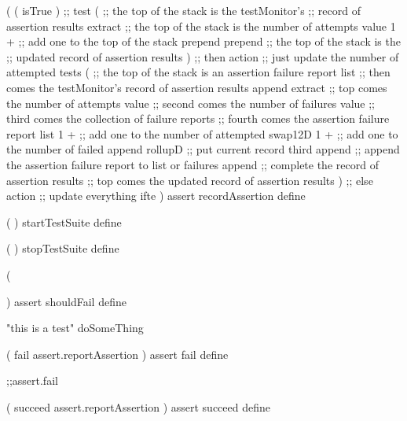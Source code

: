 \startJoylolCode
(
  (
    isTrue
  )  ;; test
  (
    ;; the top of the stack is the testMonitor's
    ;; record of assertion results
    extract
    ;; the top of the stack is the number of attempts value
    1 + ;; add one to the top of the stack
    prepend
    prepend
    ;; the top of the stack is the
    ;; updated record of assertion results
  )  ;; then action ;; just update the number of attempted tests 
  (
    ;; the top of the stack is an assertion failure report list
    ;; then comes the testMonitor's record of assertion results
    append
    extract
    ;; top    comes the number of attempts value
    ;; second comes the number of failures value
    ;; third  comes the collection of failure reports
    ;; fourth comes the assertion failure report list
    1 + ;; add one to the number of attempted
    swap12D
    1 + ;; add one to the number of failed
    append
    rollupD ;; put current record third
    append  ;; append the assertion failure report to list or failures
    append  ;; complete the record of assertion results
    ;; top comes the updated record of assertion results
  )  ;; else action ;; update everything
  ifte
)
assert
recordAssertion
define
\stopJoylolCode
\stopTestSuite


\startJoylolCode
  (
  )
  startTestSuite
  define
  
  (
  )
  stopTestSuite
  define
\stopJoylolCode

\stopTestSuite



\stopTestSuite

\startTestSuite[assertShouldFail]

\startJoylolCode

(
  
)
assert
shouldFail
define
\stopJoylolCode

\startJoylolTest
"this is a test"
doSomeThing
\stopJoylolTest
\stopTestCase
\stopTestSuite

\startTestSuite[assertFail]

\startJoylolCode
(
  fail
  assert.reportAssertion
)
assert
fail
define
\stopJoylolCode

\startJoylolTest
  ;;assert.fail
\stopJoylolTest
\stopTestCase
\stopTestSuite

\startTestSuite[assertSucceed]
\startJoylolCode
(
  succeed
  assert.reportAssertion
)
assert
succeed
define
\stopJoylolCode

